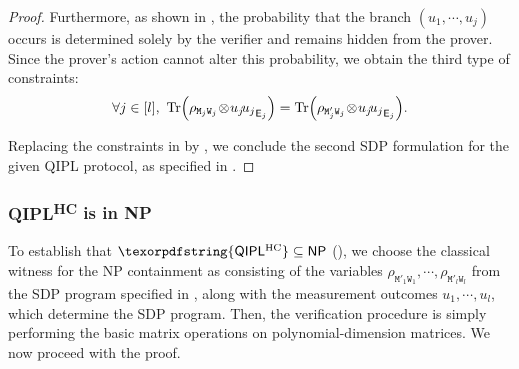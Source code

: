 \documentclass[10pt,a4paper]{article}
\numberwithin{equation}{section}
\numberwithin{figure}{section}
\newcommand{\NP}{\textnormal{\textsf{NP}}\xspace}
\newcommand{\QIPL}{\textnormal{\textsf{QIPL}}\xspace}
\newcommand{\QIPLHC}{\texorpdfstring{\textnormal{\textsf{QIPL}\textsuperscript{\textnormal{HC}}}}\xspace}
\DeclarePairedDelimiter\rbra{\lparen}{\rparen}
\let\ket\relax\DeclarePairedDelimiter\ket{\lvert}{\rangle}
\let\bra\relax\DeclarePairedDelimiter\bra{\langle}{\rvert}
\newcommand{\ketbra}[2]{\ensuremath{\ket{#1}\!\bra{#2}}}
\newcommand{\Tr}{\mathrm{Tr}}
\newcommand{\sfE}{\mathsf{E}}
\newcommand{\ttM}{\mathtt{M}}
\newcommand{\ttW}{\mathtt{W}}
\begin{document}
\begin{proof}
    Furthermore, as shown in , the probability that the branch $(u_1,\cdots,u_j)$ occurs is determined solely by the verifier and remains hidden from the prover. Since the prover's action cannot alter this probability, we obtain the third type of constraints:
    \begin{equation}
        \label{eq:QIPL-prover-actions-normalization}
        \forall j \in [l],~\Tr\rbra*{\rho_{\ttM_j\ttW_j} \!\otimes\! \ketbra{u_j}{u_j}_{\sfE_j}} = \Tr\rbra*{\rho_{\ttM'_j\ttW_j} \!\otimes\! \ketbra{u_j}{u_j}_{\sfE_j}}.
    \end{equation}

    Replacing the constraints in  by , we conclude the second SDP formulation for the  given \QIPL{} protocol, as specified in . 
\end{proof}

\subsubsection{\QIPLHC{} is in \NP{}}
\label{subsubsec:QIPL-upper-bounds}

To establish that $\QIPLHC \subseteq \NP$ (), we choose the classical witness for the \NP{} containment as consisting of the variables $\rho_{\ttM'_1\ttW_1}, \cdots, \rho_{\ttM'_l\ttW_l}$ from the SDP program specified in  , along with the measurement outcomes $u_1,\cdots,u_l$, which determine the SDP program. Then, the verification procedure is simply performing the basic matrix operations on polynomial-dimension matrices. We now proceed with the proof. 
\end{document}
